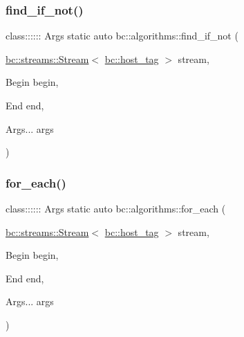 \mbox{\label{namespacebc_1_1algorithms_a24ea4f55c7904296a82c1e6f6515cc46}} 
\subsubsection{\texorpdfstring{find\+\_\+if\+\_\+not()}{find\_if\_not()}}
{\footnotesize\ttfamily class\+:::::: Args static auto bc\+::algorithms\+::find\+\_\+if\+\_\+not (\begin{DoxyParamCaption}\item[{\hyperlink{classbc_1_1streams_1_1Stream}{bc\+::streams\+::\+Stream}$<$ \hyperlink{structbc_1_1host__tag}{bc\+::host\+\_\+tag} $>$}]{stream,  }\item[{Begin}]{begin,  }\item[{End}]{end,  }\item[{Args...}]{args }\end{DoxyParamCaption})}

\mbox{\label{namespacebc_1_1algorithms_a950818852a34ad7c112c6d432b62ab56}} 
\subsubsection{\texorpdfstring{for\+\_\+each()}{for\_each()}}
{\footnotesize\ttfamily class\+:::::: Args static auto bc\+::algorithms\+::for\+\_\+each (\begin{DoxyParamCaption}\item[{\hyperlink{classbc_1_1streams_1_1Stream}{bc\+::streams\+::\+Stream}$<$ \hyperlink{structbc_1_1host__tag}{bc\+::host\+\_\+tag} $>$}]{stream,  }\item[{Begin}]{begin,  }\item[{End}]{end,  }\item[{Args...}]{args }\end{DoxyParamCaption})}

\mbox{\label{namespacebc_1_1algorithms_a9377b5d8710a009d9746680a1d3e7016}} 
